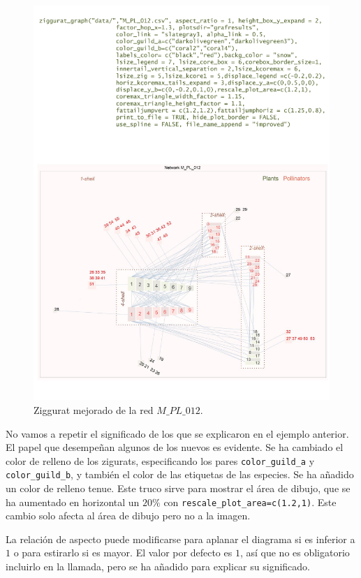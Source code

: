 \clearpage
\begin{figure}[hbt!]
\centering
\includegraphics[scale=0.8]{ManFigs/M_PL_012_ziggurat_improved.pdf}
\caption {Ziggurat mejorado de la red $M\_PL\_012$.}
\label{fig:AKMAN_ziggurat_012_improved}
\end{figure}

\clearpage
No vamos a repetir el significado de los que se explicaron en el ejemplo anterior. El papel que desempeñan algunos de los nuevos
es evidente. Se ha cambiado el color de relleno de los zigurats, especificando los pares \texttt{color\_guild\_a} y \texttt{color\_guild\_b},
y también el color de las etiquetas de las especies. Se ha añadido un color de relleno tenue. Este truco sirve para mostrar el área de dibujo, que se ha aumentado en horizontal un $20\%$ con \texttt{rescale\_plot\_area=c(1.2,1)}. Este cambio solo afecta al área de dibujo pero no a la imagen. 

La relación de aspecto puede modificarse para aplanar el diagrama si es inferior a $1$ o para estirarlo si es mayor. El valor por defecto es $1$, así que no es obligatorio incluirlo en la llamada, pero se ha añadido para explicar su significado.

